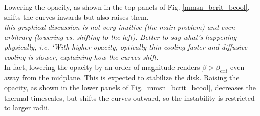 Lowering the opacity, as shown in the top panels of
Fig. \ref{mmsn_bcrit_bcool}, shifts the curves inwards but also raises
them.\\
\emph{this graphical discussion is not very inuitive (the main problem) and even arbitrary (lowering vs. shifting to the left).  Better to say what's happening physically, i.e. `With higher opacity, optically thin cooling faster and diffusive cooling is slower, explaining how the curves shift.} \\
In fact, lowering the opacity by an order of magnitude renders  
$\beta > \beta_\mathrm{crit}$ even away from the midplane. This is 
expected to stabilize the disk. Raising the opacity, as shown in 
the lower panels of Fig. \ref{mmsn_bcrit_bcool}, decreases the thermal
timescales, but shifts the curves outward, so the instability is
restricted to larger radii.  

